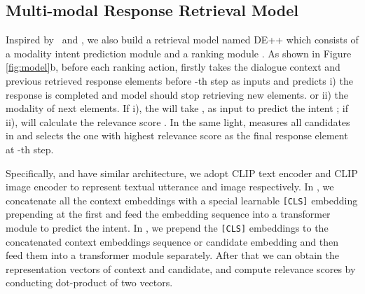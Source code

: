 \documentclass[11pt]{article}
\begin{document}
\subsection{Multi-modal Response Retrieval Model}
Inspired by~\citet{parekh-etal-2021-crisscrossed} and \citet{zang-etal-2021-photochat}, we also build a retrieval model  named DE++ which consists of a modality intent prediction module  and a ranking module . As shown in Figure \ref{fig:model}b, before each ranking action,  firstly takes the dialogue context  and previous retrieved response elements  before -th step as inputs and predicts i) the response is completed and model should stop retrieving new elements. or ii) the modality of next elements. If i), the  will take ,  as input to predict the intent ; if ii),  will calculate the relevance score  . In the same light,   measures all candidates in   and selects the one with highest relevance score as the final response element at -th step.




Specifically,  and  have similar architecture, we adopt CLIP text encoder and CLIP image encoder to represent textual utterance and image respectively. In , we concatenate all the context embeddings with a special learnable \texttt{[CLS]} embedding prepending at the first and feed the embedding sequence into a transformer module to predict the intent. In , we prepend the \texttt{[CLS]} embeddings to the concatenated context embeddings sequence or candidate embedding and then feed them into a transformer module separately. After that we can obtain the representation vectors of context and candidate, and compute relevance scores by conducting dot-product of two vectors.
\end{document}
